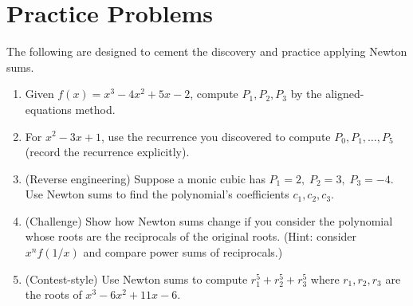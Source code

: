 \documentclass{tufte-handout}
\begin{document}
\bigskip
\section*{Practice Problems}
The following are designed to cement the discovery and practice applying Newton sums.

\begin{enumerate}[label=\textbf{P\arabic*.}, leftmargin=*, itemsep=1.2em]
  \item Given $f(x)=x^3-4x^2+5x-2$, compute $P_1,P_2,P_3$ by the aligned-equations method.
  \item For $x^2-3x+1$, use the recurrence you discovered to compute $P_0,P_1,\dots,P_5$ (record the recurrence explicitly).
  \item (Reverse engineering) Suppose a monic cubic has $P_1=2,\; P_2=3,\; P_3=-4$. Use Newton sums to find the polynomial's coefficients $c_1,c_2,c_3$.
  \item (Challenge) Show how Newton sums change if you consider the polynomial whose roots are the reciprocals of the original roots. 
  (Hint: consider $x^n f(1/x)$ and compare power sums of reciprocals.)
  \item (Contest-style) Use Newton sums to compute $r_1^5+r_2^5+r_3^5$ where $r_1,r_2,r_3$ are the roots of $x^3-6x^2+11x-6$.
\end{enumerate}

\bigskip
\end{document}
